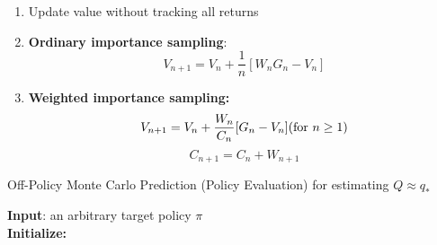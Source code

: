 \begin{enumerate}
    \item Update value without tracking all returns
    
    \item \textbf{Ordinary importance sampling}:
    \[
        V_{n+1} = V_n + \displaystyle\dfrac{1}{n}[W_nG_n - V_n]
    \]

    \item \textbf{Weighted importance sampling:}
    \[
        V_{n+1} = V_n + \displaystyle\dfrac{W_n}{C_n}[G_n - V_n] \hfill \text{(for $n\geq 1$)}
    \]
    \[
        C_{n+1} = C_n + W_{n+1}
    \]
\end{enumerate}

\begin{algorithm}[h!]
    \caption{Off-Policy Monte Carlo Prediction (Policy Evaluation) for estimating $Q \approx q_*$}

    \textbf{Input}: an arbitrary target policy $\pi$\\

    \textbf{Initialize:}\\

\end{algorithm}


